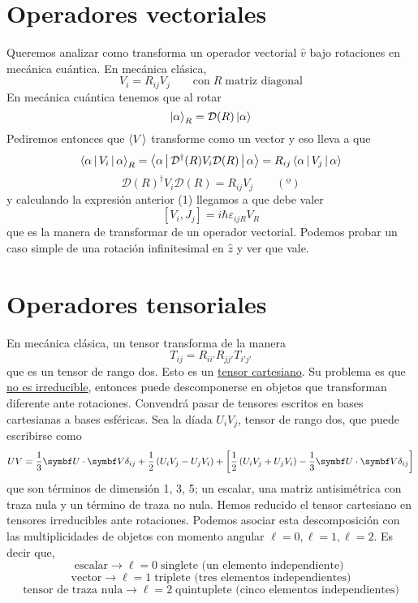 \documentclass[10pt,oneside]{CBFT_book}
\begin{document}
\section{Operadores vectoriales}

Queremos analizar como transforma un operador vectorial $\hat{v}$ bajo rotaciones en mecánica cuántica.
En mecánica clásica,
\[
	V_i = R_{ij} V_j \qquad \text{con} \; R \; \text{matriz diagonal}
\]
En mecánica cuántica tenemos que al rotar
\[
	\Ket{\alpha}_R = \mathcal{D}(R)\Ket{\alpha}
\]
Pediremos entonces que $\Braket{V}$ transforme como un vector y eso lleva a que 
\[
	\Braket{\alpha|V_i|\alpha}_R = \Braket{\alpha|\mathcal{D}^\dagger(R)V_i\mathcal{D}(R)|\alpha} =
	R_{ij} \Braket{\alpha|V_j|\alpha}
\]
\[
	\mathcal{D}(R)^\dagger V_i \mathcal{D}(R) = R_{ij}V_j \qquad (º)
\]
y calculando la expresión anterior (1) llegamos a que debe valer
\[
	[V_i,J_j] =  i\hbar \varepsilon_{ijR}V_R
\]
que es la manera de transformar de un operador vectorial. Podemos probar un caso simple de una rotación 
infinitesimal en $\hat{z}$ y ver que vale.


\section{Operadores tensoriales}

En mecánica clásica, un tensor transforma de la manera
\[
	T_{ij} = R_{ii'} R_{jj'} T_{i' j'}
\]
que es un tensor de rango dos. Esto es un \underline{tensor cartesiano}. Su problema es que \underline{no es 
irreducible}, entonces puede descomponerse en objetos que transforman diferente ante rotaciones.
Convendrá pasar de tensores escritos en bases cartesianas a bases esféricas.
Sea la díada $U_iV_j$, tensor de rango dos, que puede escribirse como 
\[
	UV = \frac{1}{3}\vb{U}\cdot\vb{V}\delta_{ij} + \frac{1}{2}\left( U_iV_j - U_jV_i \right) +
	\left[ \frac{1}{2}\left( U_iV_j + U_jV_i \right) - \frac{1}{3}\vb{U}\cdot\vb{V}\delta_{ij}\right]
\]
que son términos de dimensión 1, 3, 5; un escalar, una matriz antisimétrica con traza nula y un término
de traza no nula.
Hemos reducido el tensor cartesiano en tensores irreducibles ante rotaciones. 
Podemos asociar esta descomposición con las multiplicidades de objetos con momento angular 
$\ell=0, \ell=1, \ell=2$. Es decir que,
\[
	\text{escalar} \longrightarrow \ell=0 \; \text{singlete (un elemento independiente) }
\]
\[
	\text{vector} \longrightarrow \ell=1 \; \text{triplete (tres elementos independientes)}
\]
\[
	\text{tensor de traza nula} \longrightarrow \ell=2 \; \text{quintuplete (cinco elementos 
independientes)}
\]
\end{document}

